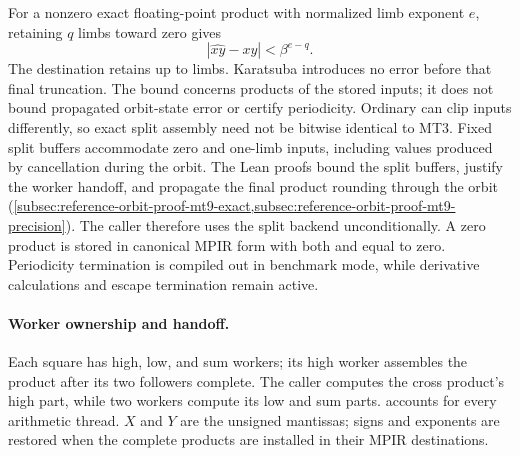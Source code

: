 For a nonzero exact floating-point product with normalized limb exponent $e$,
retaining $q$ limbs toward zero gives
\begin{equation}
 |\widehat{xy}-xy|<\beta^{e-q}.
 \label{eq:mt9-local-truncation}
\end{equation}
The destination retains up to  limbs. Karatsuba introduces
no error before that final truncation. The bound concerns products of the
stored inputs; it does not bound propagated orbit-state error or certify periodicity.
Ordinary  can clip inputs differently, so exact split assembly
need not be bitwise identical to MT3. Fixed split buffers accommodate zero and
one-limb inputs, including values produced by cancellation during the orbit.
The Lean proofs bound the split buffers, justify the worker handoff, and
propagate the final product rounding through the orbit
(\cref{subsec:reference-orbit-proof-mt9-exact,subsec:reference-orbit-proof-mt9-precision}).
The caller therefore uses the split backend unconditionally. A zero product
is stored in canonical MPIR form with both  and
 equal to zero. Periodicity termination is compiled out in
benchmark mode, while derivative calculations and escape termination remain active.

\paragraph{Worker ownership and handoff.}
Each square has high, low, and sum workers; its high worker assembles the
product after its two followers complete. The caller computes the cross
product's high part, while two workers compute its low and sum parts.
 accounts for every arithmetic thread. $X$ and $Y$
are the unsigned mantissas; signs and exponents are restored when the complete
products are installed in their MPIR destinations.

